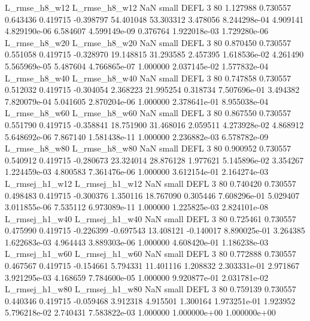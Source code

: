  L_rmse_h8_w12  L_rmse_h8_w12                   NaN      small     DEFL                 3 80 1.127988       0.730557 0.643436       0.419715   -0.398797     54.401048     53.303312     3.478056   8.244298e-04  4.909141 4.829190e-06     6.584607   4.599149e-09            0.376764    1.922018e-03        1.729280e-06
 L_rmse_h8_w20  L_rmse_h8_w20                   NaN      small     DEFL                 3 80 0.870450       0.730557 0.551058       0.419715   -0.328970     19.148815     31.293585     2.457395   1.618536e-02  4.261490 5.565969e-05     5.487604   4.766865e-07            1.000000    2.037145e-02        1.577832e-04
 L_rmse_h8_w40  L_rmse_h8_w40                   NaN      small     DEFL                 3 80 0.747858       0.730557 0.512032       0.419715   -0.304054      2.368223     21.995254     0.318734   7.507696e-01  3.494382 7.820079e-04     5.041605   2.870204e-06            1.000000    2.378641e-01        8.955038e-04
 L_rmse_h8_w60  L_rmse_h8_w60                   NaN      small     DEFL                 3 80 0.867550       0.730557 0.551790       0.419715   -0.358841     18.751900     31.468016     2.059511   4.273928e-02  4.868912 5.648692e-06     7.867140   1.581438e-11            1.000000    2.236882e-03        6.578782e-09
 L_rmse_h8_w80  L_rmse_h8_w80                   NaN      small     DEFL                 3 80 0.900952       0.730557 0.540912       0.419715   -0.280673     23.324014     28.876128     1.977621   5.145896e-02  3.354267 1.224459e-03     4.800583   7.361476e-06            1.000000    3.612154e-01        2.164274e-03
L_rmsej_h1_w12 L_rmsej_h1_w12                   NaN      small     DEFL                 3 80 0.740420       0.730557 0.498483       0.419715   -0.300376      1.350116     18.767090     0.305446   7.608296e-01  5.029407 3.011855e-06     7.535112   6.973089e-11            1.000000    1.225825e-03        2.824101e-08
L_rmsej_h1_w40 L_rmsej_h1_w40                   NaN      small     DEFL                 3 80 0.725461       0.730557 0.475990       0.419715   -0.226399     -0.697543     13.408121    -0.140017   8.890025e-01  3.264385 1.622683e-03     4.964443   3.889303e-06            1.000000    4.608420e-01        1.186238e-03
L_rmsej_h1_w60 L_rmsej_h1_w60                   NaN      small     DEFL                 3 80 0.772888       0.730557 0.467567       0.419715   -0.154661      5.794331     11.401116     1.208832   2.303331e-01  2.971867 3.921295e-03     4.168659   7.784600e-05            1.000000    9.920877e-01        2.031781e-02
L_rmsej_h1_w80 L_rmsej_h1_w80                   NaN      small     DEFL                 3 80 0.759139       0.730557 0.440346       0.419715   -0.059468      3.912318      4.915501     1.300164   1.973251e-01  1.923952 5.796218e-02     2.740431   7.583822e-03            1.000000    1.000000e+00        1.000000e+00
